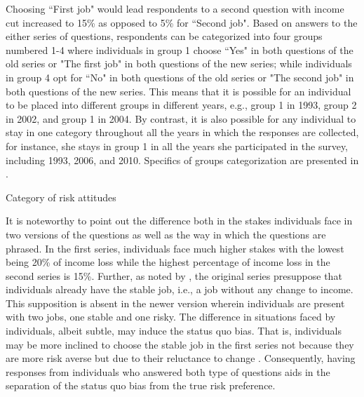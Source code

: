 \documentclass[emulatestandardclasses, 10pt, abstract = true]{scrartcl}
\begin{document}
Choosing ``First job" would lead respondents to a second question with income cut increased to 15\% as opposed to 5\% for ``Second job". Based on answers to the either series of questions, respondents can be categorized into four groups numbered 1-4 where individuals in group 1 choose ``Yes" in both questions of the old series or "The first job" in both questions of the new series; while individuals in group 4 opt for ``No" in both questions of the old series or "The second job" in both questions of the new series. This means that it is possible for an individual to be placed into different groups in different years, e.g., group 1 in 1993, group 2 in 2002, and group 1 in 2004. By contrast, it is also possible for any individual to stay in one category throughout all the years in which the responses are collected, for instance, she stays in group 1 in all the years she participated in the survey, including 1993, 2006, and 2010. Specifics of groups categorization are presented in . 

\begin{table}[!b]
	\centering
	\setlength{\extrarowheight}{0.2em}
	\caption{Category of risk attitudes}	
	
	\label{table:risk-category}
\end{table}

It is noteworthy to point out the difference both in the stakes individuals face in two versions of the questions as well as the way in which the questions are phrased. In the first series, individuals face much higher stakes with the lowest being 20\% of income loss while the highest percentage of income loss in the second series is 15\%. Further, as noted by \citet{kimball2008imputing,kimball2009risk}, the original series presuppose that individuals already have the stable job, i.e., a job without any change to income. This supposition is absent in the newer version wherein individuals are present with two jobs, one stable and one risky. The difference in situations faced by individuals, albeit subtle, may induce the status quo bias. That is, individuals may be more inclined to choose the stable job in the first series not because they are more risk averse but due to their reluctance to change \citep{samuelson1988status,tversky1991loss}. Consequently, having responses from individuals who answered both type of questions aids in the separation of the status quo bias from the true risk preference.
\end{document}
